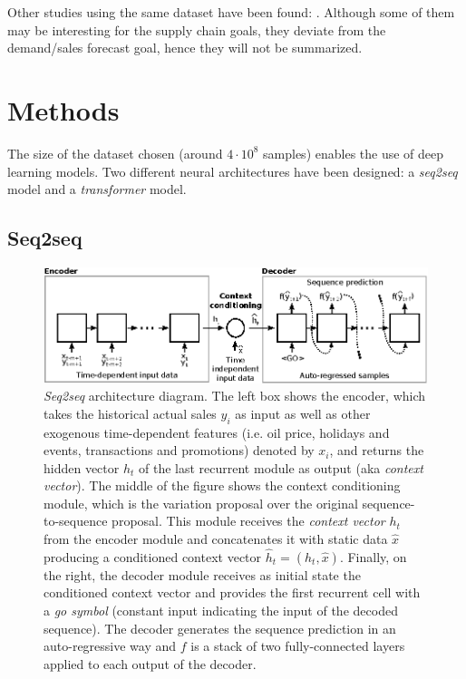 Other studies using the same dataset have been found: \autocite{wang2020c, Shaikhha2020, Schleich2019, Lim2019, Curtin2020, Malik2019, Kuleshov2018, Khamis2020}. Although some of them may be interesting for the supply chain goals, they deviate from the demand/sales forecast goal, hence they will not be summarized.

\section{Methods} \label{sec:salesforecast_methods}
The size of the dataset chosen (around $4\cdot10^8$ samples) enables the use of deep learning models. Two different neural architectures have been designed: a \textit{seq2seq} model and a \textit{transformer} model.

\subsection{Seq2seq}  %

\begin{figure}
	\centering
	\includegraphics[width=1\linewidth]{salesforecast/images/s2s}
	\caption[Diagram of the \textit{seq2seq} architecture]{\textit{Seq2seq} architecture diagram. The left box shows the encoder, which takes the historical actual sales $y_i$ as input as well as other exogenous time-dependent features (i.e. oil price, holidays and events, transactions and promotions) denoted by $x_i$, and returns the hidden vector $h_t$ of the last recurrent module as output (aka \textit{context vector}). The middle of the figure shows the context conditioning module, which is the variation proposal over the original sequence-to-sequence proposal. This module receives the \textit{context vector} $h_t$ from the encoder module and concatenates it with static data $\hat{x}$ producing a conditioned context vector $\hat{h}_t = (h_t, \hat{x})$. Finally, on the right, the decoder module receives as initial state the conditioned context vector and provides the first recurrent cell with a \textit{go symbol} (constant input indicating the input of the decoded sequence). The decoder generates the sequence prediction in an auto-regressive way and $f$ is a stack of two fully-connected layers applied to each output of the decoder.}
	\label{fig:s2s}
\end{figure}

